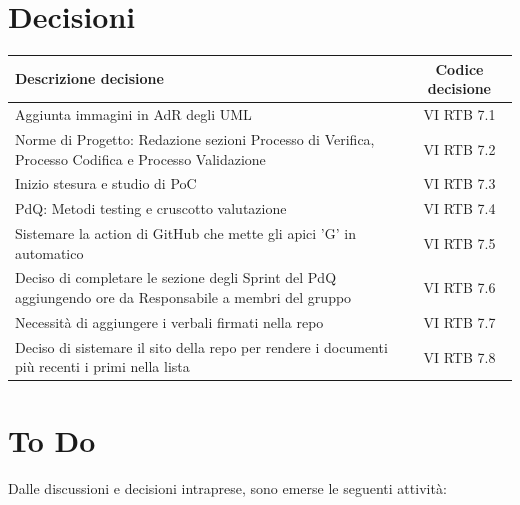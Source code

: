 \documentclass[a4paper,12pt]{article}
\newcommand{\ignoreglossary}{}
\begin{document}
\section{Decisioni}
\begin{center}
\small
\renewcommand{\arraystretch}{1.2} 
\begin{tabular}{|p{}|c|}
\hline
\rowcolor{gray!60} 
\textbf{Descrizione decisione} & \textbf{Codice decisione} \\
\hline
\rowcolor{white}
Aggiunta immagini in AdR degli UML & VI \ignoreglossary{RTB} 7.1 \\
\hline
\rowcolor{gray!20}
Norme di Progetto: Redazione sezioni Processo di Verifica, Processo Codifica e Processo Validazione &  VI \ignoreglossary{RTB} 7.2 \\
\hline
\rowcolor{white}
Inizio stesura e studio di PoC &  VI \ignoreglossary{RTB} 7.3\\
\hline
\rowcolor{gray!20}
PdQ: Metodi testing e cruscotto valutazione &  VI \ignoreglossary{RTB} 7.4 \\
\hline
\rowcolor{white}
Sistemare la action di GitHub che mette gli apici 'G' in automatico &  VI \ignoreglossary{RTB} 7.5\\
\hline
\rowcolor{gray!20}
Deciso di completare le sezione degli Sprint del PdQ aggiungendo ore da Responsabile a membri del gruppo &  VI \ignoreglossary{RTB} 7.6 \\
\hline
\rowcolor{white}
Necessità di aggiungere i verbali firmati nella repo &  VI \ignoreglossary{RTB} 7.7\\
\hline
\rowcolor{gray!20}
Deciso di sistemare il sito della repo per rendere i documenti più recenti i primi nella lista &  VI \ignoreglossary{RTB} 7.8 \\
\hline
\end{tabular}
\end{center}

\section{To Do}
Dalle discussioni e decisioni intraprese, sono emerse le seguenti attività:
\end{document}
